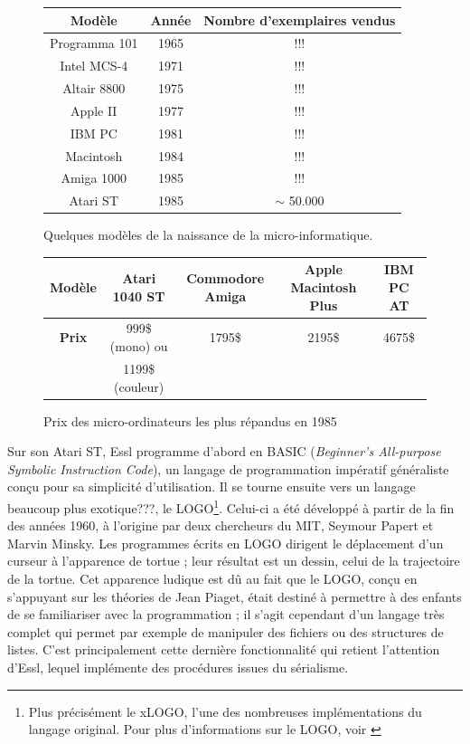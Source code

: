 \documentclass[a4paper,12pt]{article}
\begin{document}
\begin{figure}[h!]
\begin{center}
\begin{tabular}{|c|c|c|}
\hline
\textbf{Modèle} & \textbf{Année} & \textbf{Nombre d'exemplaires vendus} \\
\hline
Programma 101 & 1965 & !!! \\
\hline
Intel MCS-4 & 1971 & !!! \\
\hline
Altair 8800 & 1975 & !!! \\
\hline
Apple II & 1977 & !!! \\
\hline
IBM PC & 1981 & !!! \\ %
\hline
Macintosh & 1984 & !!! \\
\hline
Amiga 1000 & 1985 & !!! \\
\hline
Atari ST & 1985 & $\sim$ 50.000 \\
\hline
\end{tabular}
\caption{\footnotesize Quelques modèles de la naissance de la micro-informatique.}
\label{micropc}
\end{center}
\end{figure}

\begin{figure}[h!]
\begin{center}
\begin{tabular}{|c|c|c|c|c|}
\hline
\textbf{Modèle} & Atari 1040 ST & Commodore Amiga & Apple Macintosh Plus & IBM PC AT \\
\hline
\textbf{Prix} & 999\$ (mono) ou & 1795\$ & 2195\$ & 4675\$ \\
& 1199\$ (couleur) & & & \\
\hline
\end{tabular}
\caption{\footnotesize Prix des micro-ordinateurs les plus répandus en 1985}
\label{prixpc}
\end{center}
\end{figure}

Sur son Atari ST, Essl programme d'abord en BASIC (\emph{Beginner's All-purpose Symbolic Instruction Code}), un langage de programmation impératif généraliste conçu pour sa simplicité d'utilisation. Il se tourne ensuite vers un langage beaucoup plus exotique???, le LOGO\footnote{Plus précisément le xLOGO, l'une des nombreuses implémentations du langage original. Pour plus d'informations sur le LOGO, voir \cite{harvey1985computer}}. Celui-ci a été développé à partir de la fin des années 1960, à l'origine par deux chercheurs du MIT, Seymour Papert et Marvin Minsky. Les programmes écrits en LOGO dirigent le déplacement d'un curseur à l'apparence de tortue ; leur résultat est un dessin, celui de la trajectoire de la tortue. Cet apparence ludique est dû au fait que le LOGO, conçu en s'appuyant sur les théories de Jean Piaget, était destiné à permettre à des enfants de se familiariser avec la programmation ; il s'agit cependant d'un langage très complet qui permet par exemple de manipuler des fichiers ou des structures de listes. C'est principalement cette dernière fonctionnalité qui retient l'attention d'Essl, lequel implémente des procédures issues du sérialisme.
\end{document}
